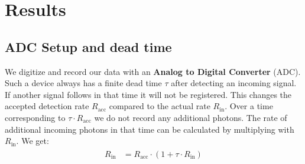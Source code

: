 \section{Results}
%
\subsection{ADC Setup and dead time}
%
We digitize and record our data with an \textbf{Analog to Digital Converter} (ADC).
Such a device always has a finite dead time $\tau$ after detecting an incoming signal.
If another signal follows in that time it will not be registered.
This changes the accepted detection rate $R_{\text{acc}}$ compared to the actual rate $R_{\text{in}}$.
Over a time corresponding to $\tau \cdot R_{\text{acc}}$ we do not record any additional photons.
The rate of additional incoming photons in that time can be calculated by multiplying with $R_{\text{in}}$.
We get:
\begin{align}
    \label{eq:DeadTime}
    \begin{split}
        R_{\text{in}} &= R_{\text{acc}} \cdot (1 + \tau \cdot R_{\text{in}} )
    \end{split}
\end{align}
%
